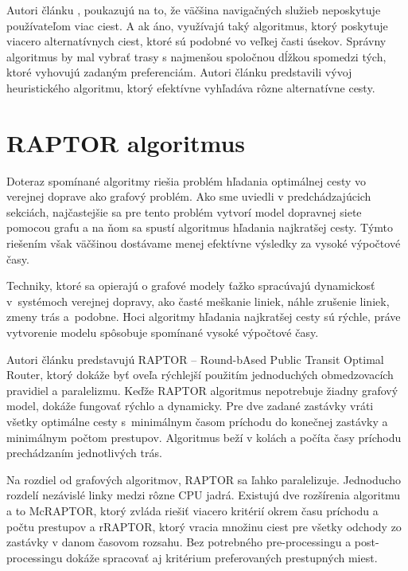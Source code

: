Autori článku \cite{dissimilar}, poukazujú na to, že väčšina navigačných služieb neposkytuje používateľom viac ciest. A ak áno, využívajú taký algoritmus, ktorý poskytuje viacero alternatívnych ciest, ktoré sú podobné vo veľkej časti úsekov. Správny algoritmus by mal vybrať trasy s najmenšou spoločnou dĺžkou spomedzi tých, ktoré vyhovujú zadaným preferenciám. Autori článku predstavili vývoj heuristického algoritmu, ktorý efektívne vyhľadáva rôzne alternatívne cesty. %


\section{RAPTOR algoritmus}
\label{sec:raptor}
Doteraz spomínané algoritmy riešia problém hľadania optimálnej cesty vo verejnej doprave ako grafový problém. Ako sme uviedli v predchádzajúcich sekciách, najčastejšie sa pre tento problém vytvorí model dopravnej siete pomocou grafu a na ňom sa spustí algoritmus hľadania najkratšej cesty. Týmto riešením však väčšinou dostávame menej efektívne výsledky za vysoké výpočtové časy.

Techniky, ktoré sa opierajú o grafové modely ťažko spracúvajú dynamickosť v~systémoch verejnej dopravy, ako časté meškanie liniek, náhle zrušenie liniek, zmeny trás a~podobne. Hoci algoritmy hľadania najkratšej cesty sú rýchle, práve vytvorenie modelu spôsobuje spomínané vysoké výpočtové časy.

Autori článku \cite{raptor} predstavujú RAPTOR – Round-bAsed Public Transit Optimal Router, ktorý dokáže byť oveľa rýchlejší použitím jednoduchých obmedzovacích pravidiel a paralelizmu. Keďže RAPTOR algoritmus nepotrebuje žiadny grafový model, dokáže fungovať rýchlo a dynamicky. Pre dve zadané zastávky vráti všetky optimálne cesty s~minimálnym časom príchodu do konečnej zastávky a minimálnym počtom prestupov. Algoritmus beží v kolách a počíta časy príchodu prechádzaním jednotlivých trás.

Na rozdiel od grafových algoritmov, RAPTOR sa ľahko paralelizuje. Jednoducho rozdelí nezávislé linky medzi rôzne CPU jadrá. Existujú dve rozšírenia algoritmu a to McRAPTOR, ktorý zvláda riešiť viacero kritérií okrem času príchodu a počtu prestupov a rRAPTOR, ktorý vracia množinu ciest pre všetky odchody zo zastávky v danom časovom rozsahu. Bez potrebného pre-processingu a post-processingu dokáže spracovať aj kritérium preferovaných prestupných miest.


